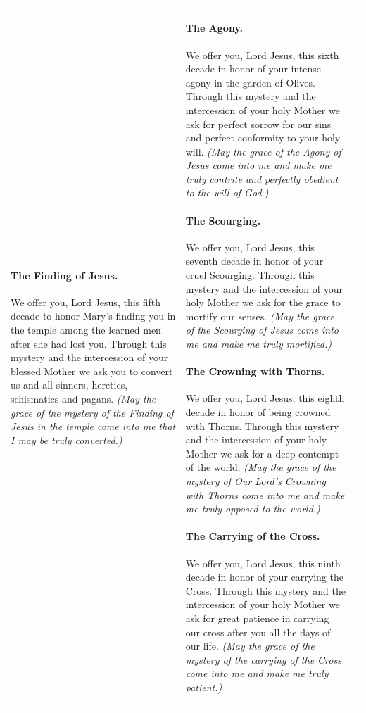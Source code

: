 \documentclass{article}
\begin{document}
\begin{tabularx}{\textwidth}{ |X|X|X| }
\paragraph{The Finding of Jesus.} We offer you, Lord Jesus, this fifth decade to honor Mary's finding you in the temple among the learned men after she had lost you. Through this mystery and the intercession of your blessed Mother we ask you to convert us and all sinners, heretics, schismatics and pagans. \textit{(May the grace of the mystery of the Finding of Jesus in the temple come into me that I may be truly converted.)}
&
\paragraph{The Agony.} We offer you, Lord Jesus, this sixth decade in honor of your intense agony in the garden of Olives. Through this mystery and the intercession of your holy Mother we ask for perfect sorrow for our sins and
perfect conformity to your holy will. \textit{(May the grace of the Agony of Jesus come into me and make me truly contrite and perfectly obedient to the will of God.)}

\paragraph{The Scourging.} We offer you, Lord Jesus, this seventh decade in honor of your cruel Scourging. Through this mystery and the intercession of your holy Mother we ask for the grace to mortify our senses. \textit{(May the grace of the Scourging of Jesus come into me and make me truly mortified.)}

\paragraph{The Crowning with Thorns.} We offer you, Lord Jesus, this eighth decade in honor of being crowned with Thorns. Through this mystery and the intercession of your holy Mother we ask for a deep contempt of the world. \textit{(May the grace of the mystery of Our Lord's Crowning with Thorns come into me and make me truly opposed to the world.)}

\paragraph{The Carrying of the Cross.} We offer you, Lord Jesus, this ninth decade in honor of your carrying the Cross. Through this mystery and the intercession of your holy Mother we ask for great patience in carrying our cross after you all the days of our life. \textit{(May the grace of the mystery of the carrying of the Cross come into me and make me truly patient.)}


\end{tabularx}
\end{document}

